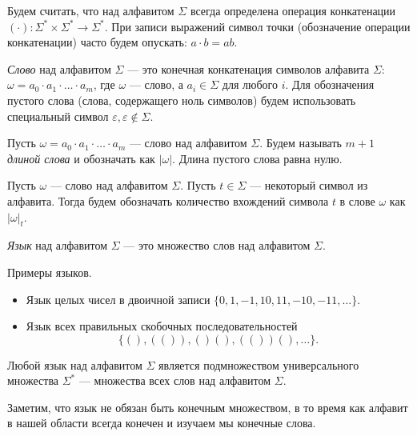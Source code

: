 Будем считать, что над алфавитом $\Sigma$ всегда определена операция конкатенации $(\cdot): \Sigma^* \times \Sigma^* \to \Sigma^*$.
При записи выражений символ точки (обозначение операции конкатенации) часто будем опускать: $a \cdot b = ab$.

\begin{definition}
  \textit{Слово} над алфавитом $\Sigma$ --- это конечная конкатенация символов алфавита $\Sigma$: $\omega = a_0 \cdot a_1 \cdot \ldots \cdot a_m$, где $\omega$ --- слово, а $a_i \in \Sigma$ для любого $i$.
  Для обозначения пустого слова (слова, содержащего ноль символов) будем использовать специальный символ $\varepsilon, \varepsilon \notin \Sigma$.
\end{definition}

\begin{definition}
  Пусть $\omega = a_0 \cdot a_1 \cdot \ldots \cdot a_m$ --- слово над алфавитом $\Sigma$.
  Будем называть $m + 1$ \textit{длиной слова} и обозначать как $|\omega|$. Длина пустого слова равна нулю.
\end{definition}

\begin{definition}
  Пусть $\omega$ --- слово над алфавитом $\Sigma$. Пусть $t \in \Sigma$ --- некоторый символ из алфавита.
  Тогда будем обозначать количество вхождений символа $t$ в слове $\omega$ как $|\omega|_t$.
\end{definition}

\begin{definition}
  \textit{Язык} над алфавитом $\Sigma$ --- это множество слов над алфавитом $\Sigma$.
\end{definition}

\begin{example}

  Примеры языков.
  
  \begin{itemize}
    \item Язык целых чисел в двоичной записи $\{0, 1, -1, 10, 11, -10, -11, \dots\}.$
    \item Язык всех правильных скобочных последовательностей $$\{(), (()), ()(), (())(), \dots\}.$$
  \end{itemize}
\end{example}

Любой язык над алфавитом $\Sigma$ является подмножеством универсального множества $\Sigma^*$ --- множества всех слов над алфавитом $\Sigma$.

Заметим, что язык не обязан быть конечным множеством, в то время как алфавит в нашей области всегда конечен и изучаем мы конечные слова.

